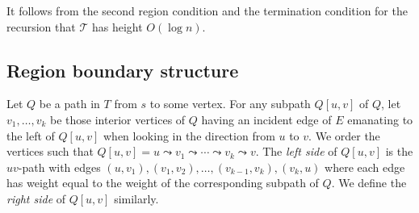 \documentclass[11pt]{article}
\begin{document}
It follows from the second region condition and the termination condition for the recursion that $\mathcal T$ has height $O(\log n)$.

\subsection{Region boundary structure}
Let $Q$ be a path in $T$ from $s$ to some vertex. For any subpath $Q[u,v]$ of $Q$, let $v_1,\ldots,v_k$ be those interior vertices of $Q$ having an incident edge of $E$ emanating to the left of $Q[u,v]$ when looking in the direction from $u$ to $v$. We order the vertices such that $Q[u,v] = u\leadsto v_1\leadsto\cdots\leadsto v_k\leadsto v$. The \emph{left side} of $Q[u,v]$ is the $uv$-path with edges $(u,v_1), (v_1,v_2),\ldots,(v_{k-1},v_k), (v_k,u)$ where each edge has weight equal to the weight of the corresponding subpath of $Q$. We define the \emph{right side} of $Q[u,v]$ similarly.
\end{document}
